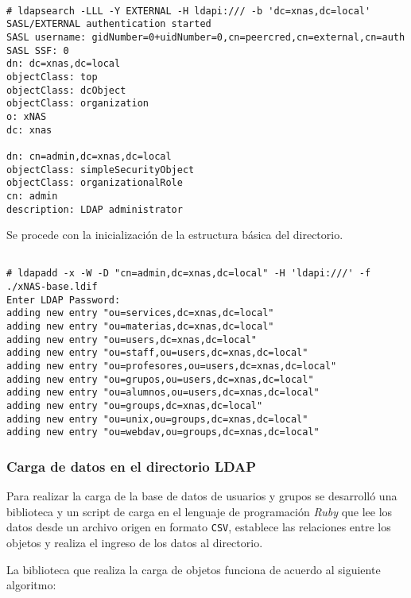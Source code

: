 {
\scriptsize
\linespread{1}
\begin{verbatim}

# ldapsearch -LLL -Y EXTERNAL -H ldapi:/// -b 'dc=xnas,dc=local'
SASL/EXTERNAL authentication started
SASL username: gidNumber=0+uidNumber=0,cn=peercred,cn=external,cn=auth
SASL SSF: 0
dn: dc=xnas,dc=local
objectClass: top
objectClass: dcObject
objectClass: organization
o: xNAS
dc: xnas

dn: cn=admin,dc=xnas,dc=local
objectClass: simpleSecurityObject
objectClass: organizationalRole
cn: admin
description: LDAP administrator
 \end{verbatim}
}

Se procede con la inicializaci\'{o}n de la estructura b\'{a}sica del directorio.

{
\scriptsize
\linespread{1}
\begin{verbatim}

# ldapadd -x -W -D "cn=admin,dc=xnas,dc=local" -H 'ldapi:///' -f ./xNAS-base.ldif
Enter LDAP Password: 
adding new entry "ou=services,dc=xnas,dc=local"
adding new entry "ou=materias,dc=xnas,dc=local"
adding new entry "ou=users,dc=xnas,dc=local"
adding new entry "ou=staff,ou=users,dc=xnas,dc=local"
adding new entry "ou=profesores,ou=users,dc=xnas,dc=local"
adding new entry "ou=grupos,ou=users,dc=xnas,dc=local"
adding new entry "ou=alumnos,ou=users,dc=xnas,dc=local"
adding new entry "ou=groups,dc=xnas,dc=local"
adding new entry "ou=unix,ou=groups,dc=xnas,dc=local"
adding new entry "ou=webdav,ou=groups,dc=xnas,dc=local"
\end{verbatim}
}

          \subsubsection {Carga de datos en el directorio \textsc{LDAP}}

Para realizar la carga de la base de datos de usuarios y grupos se desarroll\'{o} una biblioteca y un script de carga en el lenguaje de programaci\'{o}n \textsl{Ruby} que lee los datos desde un archivo origen en formato \texttt{CSV}, establece las relaciones entre los objetos y realiza el ingreso de los datos al directorio.

La biblioteca que realiza la carga de objetos funciona de acuerdo al siguiente algoritmo:

